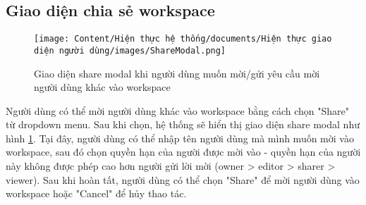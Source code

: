 \subsection{Giao diện chia sẻ workspace}

\begin{figure}[H]
    \centering
    \texttt{[image: Content/Hiện thực hệ thống/documents/Hiện thực giao diện người dùng/images/ShareModal.png]}
    \vspace{0.5cm}
    \caption{Giao diện share modal khi người dùng muốn mời/gửi yêu cầu mời người dùng khác vào workspace}
    \label{fig: Giao diện share modal khi người dùng muốn mời/gửi yêu cầu mời người dùng khác vào workspace}
\end{figure}

Người dùng có thể mời người dùng khác vào workspace bằng cách chọn "Share" từ dropdown menu. Sau khi chọn, hệ thống sẽ hiển thị giao diện share modal như hình \ref{fig: Giao diện share modal khi người dùng muốn mời/gửi yêu cầu mời người dùng khác vào workspace}. Tại đây, người dùng có thể nhập tên người dùng mà mình muốn mời vào workspace, sau đó chọn quyền hạn của người được mời vào - quyền hạn của người này không được phép cao hơn người gửi lời mời (owner > editor > sharer > viewer). Sau khi hoàn tất, người dùng có thể chọn "Share" để mời người dùng vào workspace hoặc "Cancel" để hủy thao tác.